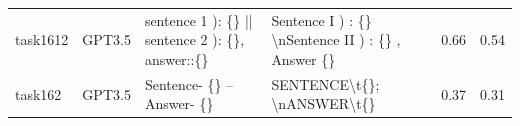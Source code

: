 \begin{longtable}{@{}p{0.8cm\tiny}p{1cm\tiny}p{4.1cm\ttfamily\tiny}p{4.1cm\ttfamily\tiny}p{0.8cm\tiny}p{0.8cm\tiny}@{}}
task1612  & GPT3.5    & sentence  1 ): \{\} || sentence  2 ): \{\}, answer::\{\}                                                                                                                                                                                                                                                                                                                                                                                                                                                                & Sentence  I ) : \{\} \textbackslash{}nSentence  II ) : \{\} ,  Answer \{\}                                                                                                                                                                                                                                                                                                                                                                                                                                                                                                        & 0.66 & 0.54 \\
task162   & GPT3.5    & Sentence- \{\} -- Answer- \{\}                                                                                                                                                                                                                                                                                                                                                                                                                                                                                          & SENTENCE\textbackslash{}t\{\}; \textbackslash{}nANSWER\textbackslash{}t\{\}                                                                                                                                                                                                                                                                                                                                                                                                                                                                                                       & 0.37 & 0.31 \\

\end{longtable}
